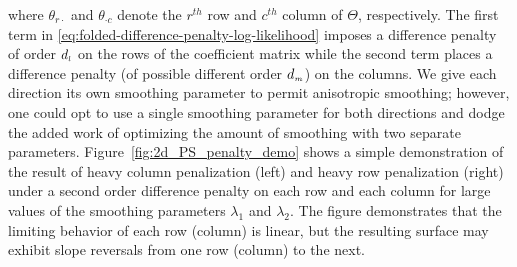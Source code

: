 \noindent
where $\theta_{r \cdot}$ and $\theta_{\cdot c}$ denote the $r^{th}$ row and $c^{th}$ column of $\Theta$, respectively. The first term in \ref{eq:folded-difference-penalty-log-likelihood} imposes a difference penalty of order $d_{\scriptscriptstyle l}$ on the rows of the coefficient matrix while the second term places a difference penalty (of possible different order $d_{\scriptscriptstyle m}$) on the columns. We give each direction its own smoothing parameter to permit anisotropic smoothing; however, one could opt to use a single smoothing parameter for both directions and dodge the added work of optimizing the amount of smoothing with two separate parameters. Figure~\ref{fig:2d_PS_penalty_demo} shows a simple demonstration of the result of heavy column penalization (left) and heavy row penalization (right) under a second order difference penalty on each row and each column for large values of the smoothing parameters $\lambda_1$ and $\lambda_2$. The figure demonstrates that the limiting behavior of each row (column) is linear, but the resulting surface may exhibit slope reversals from one row (column) to the next. 

